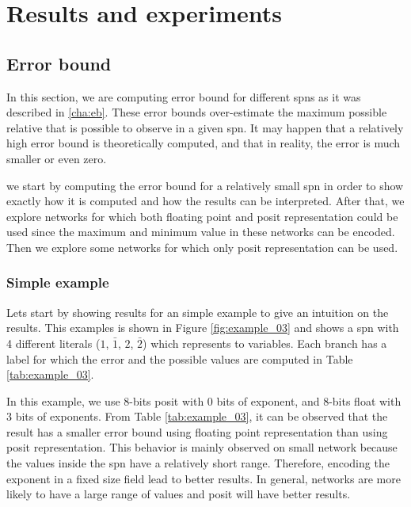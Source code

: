 
\chapter{Results and experiments}
\label{cha:res}

\section{Error bound}

In this section, we are computing error bound for different \glspl{spn} as it was described in \ref{cha:eb}. These error bounds over-estimate the maximum possible relative that is possible to observe in a given \gls{spn}. It may happen that a relatively high error bound is theoretically computed, and that in reality, the error is much smaller or even zero.

we start by computing the error bound for a relatively small \gls{spn} in order to show exactly how it is computed and how the results can be interpreted. After that, we explore networks for which both floating point and posit representation could be used since the maximum and minimum value in these networks can be encoded. Then we explore some networks for which only posit representation can be used.

\subsection{Simple example \label{sec:simple_example}}

Lets start by showing results for an simple example to give an intuition on the results. This examples is shown in Figure \ref{fig:example_03} and shows a \gls{spn} with 4 different literals ($1$, $\bar{1}$, $2$, $\bar{2}$) which represents to variables. Each branch has a label for which the error and the possible values are computed in Table \ref{tab:example_03}.

In this example, we use 8-bits posit with 0 bits of exponent, and 8-bits float with 3 bits of exponents. From Table \ref{tab:example_03}, it can be observed that the result has a smaller error bound using floating point representation than using posit representation. This behavior is mainly observed on small network because the values inside the \gls{spn} have a relatively short range. Therefore, encoding the exponent in a fixed size field lead to better results. In general, networks are more likely to have a large range of values and posit will have better results.

